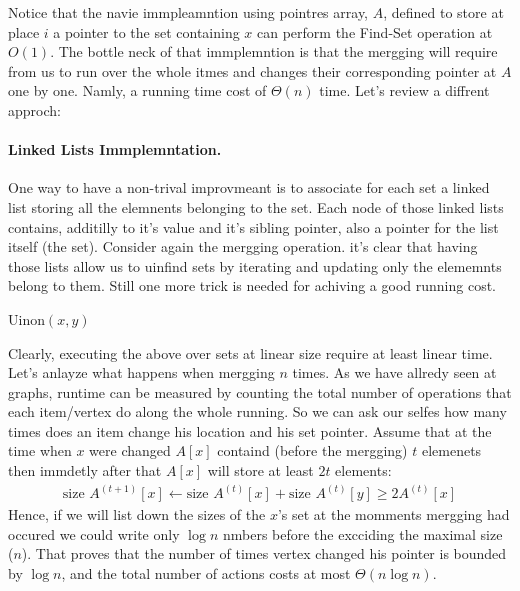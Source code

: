 Notice that the navie immpleamntion using pointres array, $A$, defined to store at place $i$ a pointer to the set containing $x$ can perform the Find-Set operation at $O\left( 1 \right)$. The bottle neck of that immplemntion is that the mergging will require from us to run over the whole itmes and changes their corresponding  pointer at $A$ one by one. Namly, a running time cost of $\Theta\left( n \right)$ time. Let's review a diffrent approch:

\paragraph{Linked Lists Immplemntation.}
One way to have a non-trival improvmeant is to associate for each set a linked list storing all the elemnents belonging to the set. Each node of those linked lists contains, additilly to it's value and it's sibling pointer, also a pointer for the list itself (the set). Consider again the mergging operation. it's clear that having those lists allow us to uinfind sets by iterating and updating only the elememnts belong to them. Still one more trick is needed for achiving a good running cost. 


\begin{algbox}{Uinon$(x,y)$}
  \begin{algorithm}[H]
  \end{algorithm}
\end{algbox}

Clearly, executing the above over sets at linear size require at least linear time. Let's anlayze what happens when  mergging $n$ times. As we have allredy seen at graphs, runtime can be measured by counting the total number of operations that each item/vertex do along the whole running. So we can ask our selfes how many times does an item change his location and his set pointer. Assume that at the time when $x$ were changed $A[x]$ containd (before the mergging) $t$ elemenets then immdetly after that $A[x]$ will store at least $2t$ elements: 
\begin{equation*}
  \begin{split}
    \text{size } A^{(t+1)}[x] \leftarrow  \text{size } A^{(t)}[x] +  \text{size } A^{(t)}[y] \ge 2A^{(t)}[x]  
  \end{split}
\end{equation*}
Hence, if we will list down the sizes of the $x$'s set at the momments mergging had occured we could write only $\log n$ nmbers before the excciding the maximal size ($n$). That proves that the number of times vertex changed his pointer is bounded by $\log n$, and the total number of actions costs at most $\Theta\left( n\log n \right)$. 

